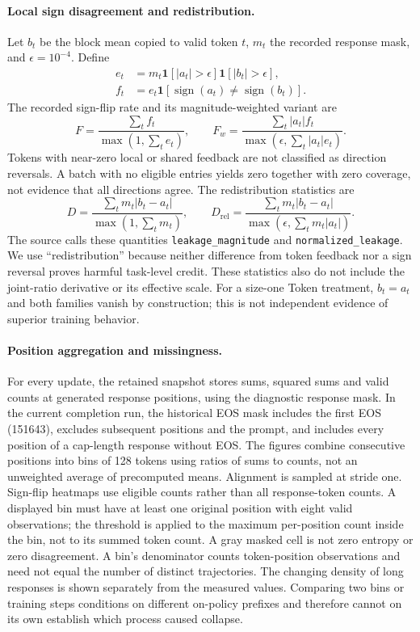 \paragraph{Local sign disagreement and redistribution.}
Let $b_t$ be the block mean copied to valid token $t$, $m_t$ the recorded response mask, and $\epsilon=10^{-4}$. Define
\begin{align}
 e_t&=m_t\mathbf1[|a_t|>\epsilon]\mathbf1[|b_t|>\epsilon],\\
 f_t&=e_t\mathbf1[\operatorname{sign}(a_t)\ne\operatorname{sign}(b_t)].
\end{align}
The recorded sign-flip rate and its magnitude-weighted variant are
\begin{equation}
 F=\frac{\sum_t f_t}{\max(1,\sum_t e_t)},\qquad
 F_w=\frac{\sum_t |a_t|f_t}{\max(\epsilon,\sum_t |a_t|e_t)}.
\end{equation}
Tokens with near-zero local or shared feedback are not classified as direction reversals. A batch with no eligible entries yields zero together with zero coverage, not evidence that all directions agree. The redistribution statistics are
\begin{equation}
 D=\frac{\sum_t m_t|b_t-a_t|}{\max(1,\sum_t m_t)},\qquad
 D_{\mathrm{rel}}=\frac{\sum_t m_t|b_t-a_t|}{\max(\epsilon,\sum_t m_t|a_t|)}.
\end{equation}
The source calls these quantities \texttt{leakage\_magnitude} and \texttt{normalized\_leakage}. We use ``redistribution'' because neither difference from token feedback nor a sign reversal proves harmful task-level credit. These statistics also do not include the joint-ratio derivative or its effective scale. For a size-one Token treatment, $b_t=a_t$ and both families vanish by construction; this is not independent evidence of superior training behavior.

\paragraph{Position aggregation and missingness.}
For every update, the retained snapshot stores sums, squared sums and valid counts at generated response positions, using the diagnostic response mask. In the current completion run, the historical EOS mask includes the first EOS (151643), excludes subsequent positions and the prompt, and includes every position of a cap-length response without EOS. The figures combine consecutive positions into bins of 128 tokens using ratios of sums to counts, not an unweighted average of precomputed means. Alignment is sampled at stride one. Sign-flip heatmaps use eligible counts rather than all response-token counts. A displayed bin must have at least one original position with eight valid observations; the threshold is applied to the maximum per-position count inside the bin, not to its summed token count. A gray masked cell is not zero entropy or zero disagreement. A bin's denominator counts token-position observations and need not equal the number of distinct trajectories. The changing density of long responses is shown separately from the measured values. Comparing two bins or training steps conditions on different on-policy prefixes and therefore cannot on its own establish which process caused collapse.

